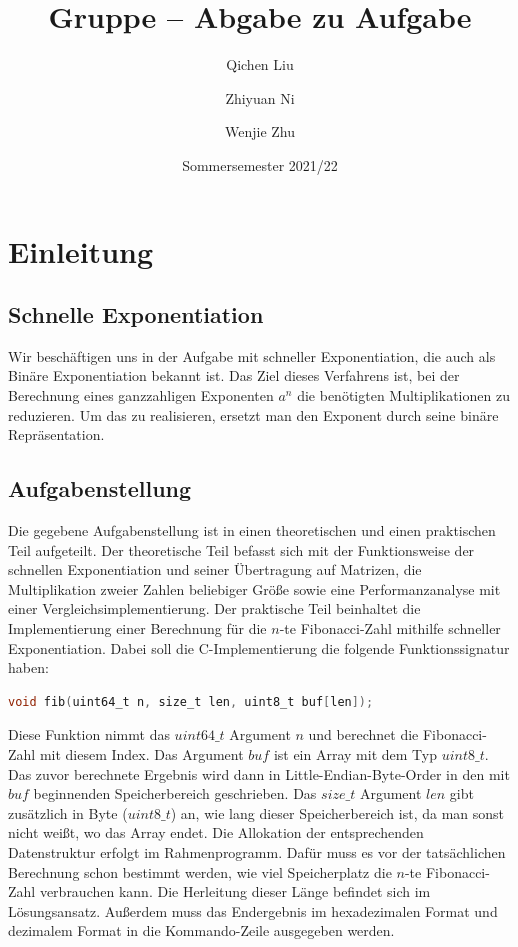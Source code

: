 \documentclass[course=erap]{aspdoc}
\author{Qichen Liu  \and Zhiyuan Ni \and Wenjie Zhu}
\date{Sommersemester 2021/22} %
\title{Gruppe \theGroup{} -- Abgabe zu Aufgabe \theNumber}
\begin{document}
\maketitle

\section{Einleitung}
\subsection{Schnelle Exponentiation}
Wir beschäftigen uns in der Aufgabe mit schneller Exponentiation, die auch als \glqq Binäre Exponentiation\grqq{} bekannt ist. Das Ziel dieses Verfahrens ist, bei der Berechnung eines ganzzahligen Exponenten $a^{n}$ die benötigten Multiplikationen zu reduzieren. Um das zu realisieren, ersetzt man den Exponent durch seine binäre Repräsentation.

\subsection{Aufgabenstellung}
Die gegebene Aufgabenstellung ist in einen theoretischen und einen praktischen Teil aufgeteilt. Der theoretische Teil befasst sich mit der Funktionsweise der schnellen Exponentiation und seiner Übertragung auf Matrizen, die Multiplikation zweier Zahlen beliebiger Größe sowie eine Performanzanalyse mit einer Vergleichsimplementierung. Der praktische Teil beinhaltet die Implementierung einer Berechnung für die $n$-te Fibonacci-Zahl mithilfe schneller Exponentiation. Dabei soll die C-Implementierung die folgende Funktionssignatur haben:
\begin{lstlisting}[language=C]
void fib(uint64_t n, size_t len, uint8_t buf[len]);
\end{lstlisting}
Diese Funktion nimmt das $uint64\_t$ Argument $n$ und berechnet die Fibonacci-Zahl mit diesem Index. Das Argument $buf$ ist ein Array mit dem Typ $uint8\_t$. Das zuvor berechnete Ergebnis wird dann in Little-Endian-Byte-Order in den mit $buf$ beginnenden Speicherbereich geschrieben. Das $size\_t$ Argument $len$ gibt zusätzlich in Byte ($uint8\_t$) an, wie lang dieser Speicherbereich ist, da man sonst nicht weißt, wo das Array endet. Die Allokation der entsprechenden Datenstruktur erfolgt im Rahmenprogramm. Dafür muss es vor der tatsächlichen Berechnung schon bestimmt werden, wie viel Speicherplatz die $n$-te Fibonacci-Zahl verbrauchen kann. Die Herleitung dieser Länge befindet sich im Lösungsansatz. Außerdem muss das Endergebnis im hexadezimalen Format und dezimalem Format in die Kommando-Zeile ausgegeben werden.
\end{document}
